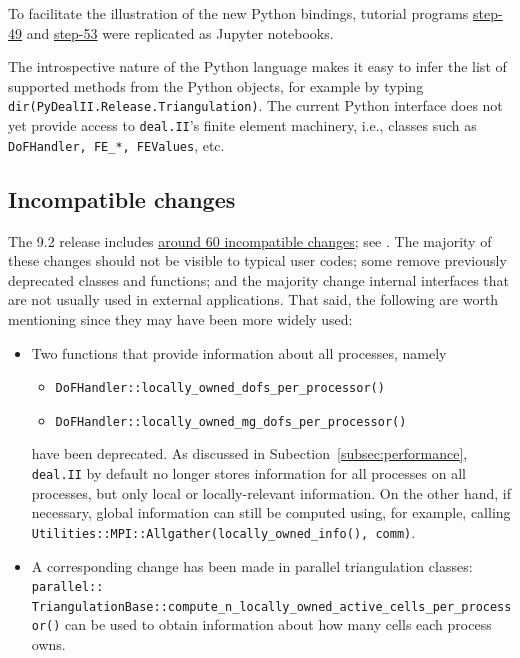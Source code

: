 \documentclass{ansarticle-preprint}
\newcommand{\specialword}[1]{\texttt{#1}}
\newcommand{\dealii}{{\specialword{deal.II}}\xspace}
\begin{document}
To facilitate the illustration of the new Python bindings, tutorial programs \href{https://github.com/dealii/dealii/blob/dealii-9.2/examples/step-49/step-49.ipynb}{step-49} and \href{https://github.com/dealii/dealii/blob/dealii-9.2/examples/step-53/step-53.ipynb}{step-53} were replicated as Jupyter notebooks.

The introspective nature of the Python language makes it easy to infer
the list of supported methods from the Python objects, for example by
typing \texttt{dir(PyDealII.Release.Triangulation)}.
The current Python interface does not yet provide access to \dealii{}'s finite element machinery, i.e., classes such as \texttt{DoFHandler, FE\_*, FEValues}, etc.

\subsection{Incompatible changes}

The 9.2 release includes
\href{https://dealii.org/developer/doxygen/deal.II/changes_between_9_1_1_and_9_2_0.html}
{around 60 incompatible changes}; see \cite{changes92}. The majority of these changes
should not be visible to typical user codes; some remove previously
deprecated classes and functions; and the majority change internal
interfaces that are not usually used in external
applications. That said, the following are worth mentioning since they
may have been more widely used:
\begin{itemize}
  \item Two functions that provide information about all processes,
        namely
        \begin{itemize}
          \item \texttt{DoFHandler::locally\_owned\_dofs\_per\_processor()}
          \item \texttt{DoFHandler::locally\_owned\_mg\_dofs\_per\_processor()}
        \end{itemize}
        have been deprecated. As discussed in
        Subection~\ref{subsec:performance}, \dealii{} by default no longer
        stores information for all processes on all processes, but only
        local or locally-relevant information. On the other
        hand, if necessary, global information can still be computed using,
        for example, calling
        \texttt{Utilities::MPI::Allgather(locally\_owned\_info(), comm)}.

  \item A corresponding change has been made in parallel triangulation
        classes:
        \texttt{parallel::} \texttt{TriangulationBase::compute\_n\_locally\_owned\_active\_cells\_per\_processor()}
        can be used to obtain information about how many cells each
        process owns.
\end{itemize}
\end{document}
